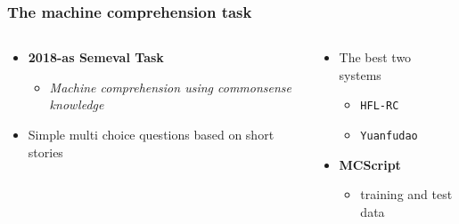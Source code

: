 \documentclass[bigger]{beamer}
\begin{document}
\begin{frame}
	\frametitle{The machine comprehension task \citep{Chen:2018, Wang:2018}}
	\begin{columns}
		\begin{column}{0.6\textwidth}
			\begin{itemize}
				\pause \item \textbf{2018-as Semeval Task}
				\begin{itemize}
					\item \textit{Machine comprehension using commonsense knowledge}
				\end{itemize}
				\pause \item Simple multi choice questions based on short stories
			\end{itemize}
		\end{column}
		\begin{column}{0.5\textwidth}
			\begin{itemize}
				\pause \item The best two systems
				\begin{itemize}
					\item \texttt{HFL-RC}
					\item \texttt{Yuanfudao}
				\end{itemize}
				\pause \item \textbf{MCScript}
				\begin{itemize}
					\item training and test data
				\end{itemize}
			\end{itemize}
		\end{column}
	\end{columns}
	
\end{frame}
\end{document}
